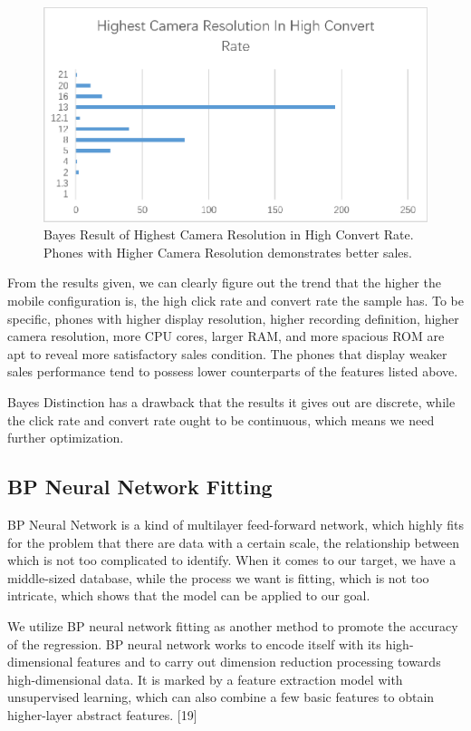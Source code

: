 \begin{figure}[!ht]
	\centering
	\includegraphics[width=360pt]{fig9.eps}
	\caption{Bayes Result of Highest Camera Resolution in High Convert Rate. Phones with Higher Camera Resolution demonstrates better sales.  }
	\label{fig9}
\end{figure}

From the results given, we can clearly figure out the trend that the higher the mobile configuration is, the high click rate and convert rate the sample has. To be specific, phones with higher display resolution, higher recording definition, higher camera resolution, more CPU cores, larger RAM, and more spacious ROM are apt to reveal more satisfactory sales condition. The phones that display weaker sales performance tend to possess lower counterparts of the features listed above. 

Bayes Distinction has a drawback that the results it gives out are discrete, while the click rate and convert rate ought to be continuous, which means we need further optimization. 

\subsection{BP Neural Network Fitting}

BP Neural Network is a kind of multilayer feed-forward network, which highly fits for the problem that there are data with a certain scale, the relationship between which is not too complicated to identify. When it comes to our target, we have a middle-sized database, while the process we want is fitting, which is not too intricate, which shows that the model can be applied to our goal. 

We utilize BP neural network fitting as another method to promote the accuracy of the regression. BP neural network works to encode itself with its high-dimensional features and to carry out dimension reduction processing towards high-dimensional data. It is marked by a feature extraction model with unsupervised learning, which can also combine a few basic features to obtain higher-layer abstract features. [19]

